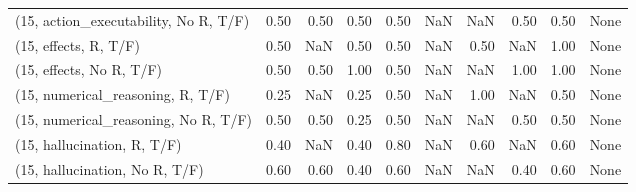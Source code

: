 \begin{table*}[h!]
\begin{adjustbox}{width=2\columnwidth,center}
\begin{tabular}{lrrr|rrr|rrr}
(15, action\_executability, No R, T/F) &                      0.50 &                  0.50 &                      0.50 &                          0.50 &                       NaN &                           NaN &                                   0.50 &                               0.50 &                                  None \\
(15, effects, R, T/F)                 &                      0.50 &                   NaN &                      0.50 &                          0.50 &                       NaN &                          0.50 &                                    NaN &                               1.00 &                                  None \\
(15, effects, No R, T/F)              &                      0.50 &                  0.50 &                      1.00 &                          0.50 &                       NaN &                           NaN &                                   1.00 &                               1.00 &                                  None \\
(15, numerical\_reasoning, R, T/F)     &                      0.25 &                   NaN &                      0.25 &                          0.50 &                       NaN &                          1.00 &                                    NaN &                               0.50 &                                  None \\
(15, numerical\_reasoning, No R, T/F)  &                      0.50 &                  0.50 &                      0.25 &                          0.50 &                       NaN &                           NaN &                                   0.50 &                               0.50 &                                  None \\
(15, hallucination, R, T/F)           &                      0.40 &                   NaN &                      0.40 &                          0.80 &                       NaN &                          0.60 &                                    NaN &                               0.60 &                                  None \\
(15, hallucination, No R, T/F)        &                      0.60 &                  0.60 &                      0.40 &                          0.60 &                       NaN &                           NaN &                                   0.40 &                               0.60 &                                  None \\

\end{tabular}
\end{adjustbox}
\end{table*}
